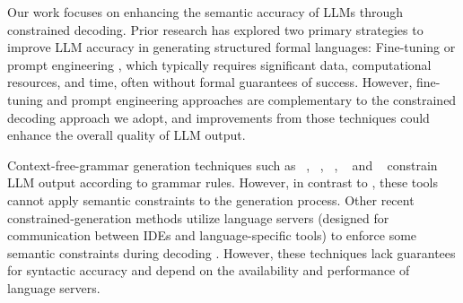 

Our work focuses on enhancing the semantic accuracy of LLMs through constrained decoding. 
Prior research has explored two primary strategies to improve LLM accuracy in generating structured formal languages:
Fine-tuning or prompt engineering \cite{bassamzadeh2024comparativestudydslcode, weyssow2024exploringparameterefficientfinetuningtechniques}, which typically requires significant data, computational resources, and time, often without formal guarantees of success.
However, fine-tuning and prompt engineering approaches are complementary to the constrained decoding approach we adopt, and improvements from those techniques could enhance the overall quality of LLM output.


Context-free-grammar generation techniques such as \tgcd{}~\cite{geng2023grammar}, \outlines{}~\cite{willard2023efficient}, \domino{}~\cite{beurerkellner2024guiding}, \syncode{}~\cite{ugare2024syncodellmgenerationgrammar} and \aici{}~\cite{Moskal2024} constrain LLM output according to grammar rules. 
However, in contrast to \Tool{}, these tools cannot apply semantic constraints to the generation process.
Other recent constrained-generation methods utilize language servers (designed for communication between IDEs and language-specific tools) to enforce some semantic constraints during decoding \cite{agrawal2023guiding, Wei_2023}. 
However, these techniques lack guarantees for syntactic accuracy and depend on the availability and performance of language servers.


